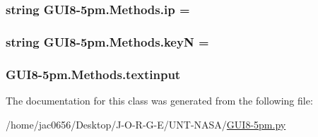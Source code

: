 \subsubsection[{\texorpdfstring{ip}{ip}}]{\setlength{\rightskip}{0pt plus 5cm}string G\+U\+I8-\/5pm.\+Methods.\+ip = \textquotesingle{}\textquotesingle{}\hspace{0.3cm}{\ttfamily [static]}}\hypertarget{classGUI8-5pm_1_1Methods_a598aeed025ae6e48d199e7d9949b3e0a}{}\label{classGUI8-5pm_1_1Methods_a598aeed025ae6e48d199e7d9949b3e0a}
\subsubsection[{\texorpdfstring{keyN}{keyN}}]{\setlength{\rightskip}{0pt plus 5cm}string G\+U\+I8-\/5pm.\+Methods.\+keyN = \textquotesingle{}\textquotesingle{}\hspace{0.3cm}{\ttfamily [static]}}\hypertarget{classGUI8-5pm_1_1Methods_a6aab21b5537f2d0ab7e6bf6d9a7aa96b}{}\label{classGUI8-5pm_1_1Methods_a6aab21b5537f2d0ab7e6bf6d9a7aa96b}
\subsubsection[{\texorpdfstring{textinput}{textinput}}]{\setlength{\rightskip}{0pt plus 5cm}G\+U\+I8-\/5pm.\+Methods.\+textinput}\hypertarget{classGUI8-5pm_1_1Methods_ae5272965fe06cade1712f5c2db307f14}{}\label{classGUI8-5pm_1_1Methods_ae5272965fe06cade1712f5c2db307f14}


The documentation for this class was generated from the following file\+:\begin{DoxyCompactItemize}
\item 
/home/jac0656/\+Desktop/\+J-\/\+O-\/\+R-\/\+G-\/\+E/\+U\+N\+T-\/\+N\+A\+S\+A/\hyperlink{GUI8-5pm_8py}{G\+U\+I8-\/5pm.\+py}\end{DoxyCompactItemize}
